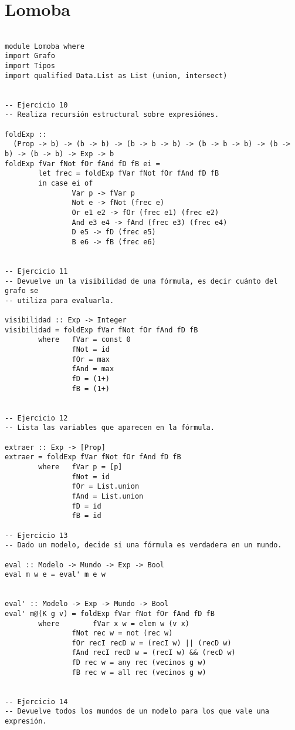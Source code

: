 \section{Lomoba}


\begin{verbatim}

module Lomoba where
import Grafo
import Tipos
import qualified Data.List as List (union, intersect)


-- Ejercicio 10
-- Realiza recursión estructural sobre expresiónes.

foldExp :: 
  (Prop -> b) -> (b -> b) -> (b -> b -> b) -> (b -> b -> b) -> (b -> b) -> (b -> b) -> Exp -> b
foldExp fVar fNot fOr fAnd fD fB ei =
        let frec = foldExp fVar fNot fOr fAnd fD fB
        in case ei of
                Var p -> fVar p
                Not e -> fNot (frec e)
                Or e1 e2 -> fOr (frec e1) (frec e2)
                And e3 e4 -> fAnd (frec e3) (frec e4)
                D e5 -> fD (frec e5)
                B e6 -> fB (frec e6)


-- Ejercicio 11
-- Devuelve un la visibilidad de una fórmula, es decir cuánto del grafo se
-- utiliza para evaluarla.

visibilidad :: Exp -> Integer
visibilidad = foldExp fVar fNot fOr fAnd fD fB
        where   fVar = const 0
                fNot = id
                fOr = max
                fAnd = max
                fD = (1+)
                fB = (1+)


-- Ejercicio 12
-- Lista las variables que aparecen en la fórmula.

extraer :: Exp -> [Prop]
extraer = foldExp fVar fNot fOr fAnd fD fB
        where   fVar p = [p]
                fNot = id
                fOr = List.union
                fAnd = List.union
                fD = id
                fB = id

-- Ejercicio 13
-- Dado un modelo, decide si una fórmula es verdadera en un mundo.

eval :: Modelo -> Mundo -> Exp -> Bool
eval m w e = eval' m e w


eval' :: Modelo -> Exp -> Mundo -> Bool
eval' m@(K g v) = foldExp fVar fNot fOr fAnd fD fB
        where        fVar x w = elem w (v x)
                fNot rec w = not (rec w)
                fOr recI recD w = (recI w) || (recD w)
                fAnd recI recD w = (recI w) && (recD w)
                fD rec w = any rec (vecinos g w)
                fB rec w = all rec (vecinos g w)


-- Ejercicio 14
-- Devuelve todos los mundos de un modelo para los que vale una expresión.


\end{verbatim}
